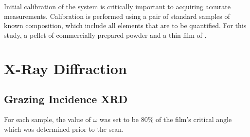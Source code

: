 Initial calibration of the system is critically important to acquiring accurate measurements. Calibration is performed using a pair of standard samples of known composition, which include all elements that are to be quantified. For this study, a pellet of commercially prepared \PTO{} powder and a thin film of .


\section{X-Ray Diffraction}
\label{sec:Methods-XRD}

\lipsum


\subsection{Grazing Incidence XRD}

For each sample, the value of $\omega$ was set to be 80\% of the film's critical angle which was determined prior to the scan. 





